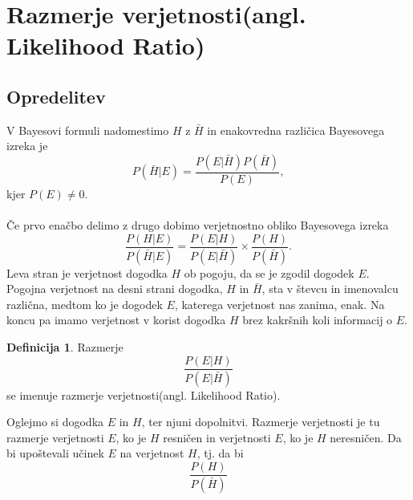 \documentclass[12pt,a4paper]{amsart}
\theoremstyle{definition} %
\newtheorem{definicija}{Definicija}[section]
\theoremstyle{plain} %
\begin{document}
\section{Razmerje verjetnosti(angl. Likelihood Ratio)}

\subsection{Opredelitev}
V Bayesovi formuli %
nadomestimo $H$ z $\bar{H}$ in enakovredna različica Bayesovega izreka je 
\begin{equation}
    P(\bar{H} \lvert E) = \frac{P(E \lvert \bar{H})P(\bar{H})}{P(E)},
\end{equation}
kjer $P(E) \ne 0$.\\\\
Če prvo enačbo delimo z drugo dobimo verjetnostno obliko Bayesovega izreka
\begin{equation}
    \frac{P(H \lvert E)}{P(\bar{H} \lvert E)} = \frac{P(E \lvert H)}{P(E \lvert \bar{H})} \times \frac{P(H)}{P(\bar{H})}.
\end{equation}
Leva stran je verjetnost dogodka $H$ ob pogoju, da se je zgodil dogodek $E$. Pogojna verjetnost na desni strani dogodka, $H$ in $\bar{H}$, 
sta v števcu in imenovalcu različna, medtom ko je dogodek $E$, katerega verjetnost nas zanima, enak. Na koncu pa imamo verjetnost v 
korist dogodka $H$ brez kakršnih koli informacij o $E$.\\
\begin{definicija}
    Razmerje
    \begin{equation}
        \frac{P(E \lvert H)}{P(E \lvert \bar{H})}
    \end{equation}
    se imenuje razmerje verjetnosti(angl. Likelihood Ratio). \\
\end{definicija}
Oglejmo si dogodka $E$ in $H$, ter njuni dopolnitvi. Razmerje verjetnosti je tu razmerje verjetnosti $E$, ko je $H$ resničen in verjetnosti $E$, 
ko je $H$ neresničen. Da bi upoštevali učinek $E$ na verjetnost $H$, tj. da bi 
\[
    \frac{P(H)}{P(\bar{H})} 
\] 
\end{document}
